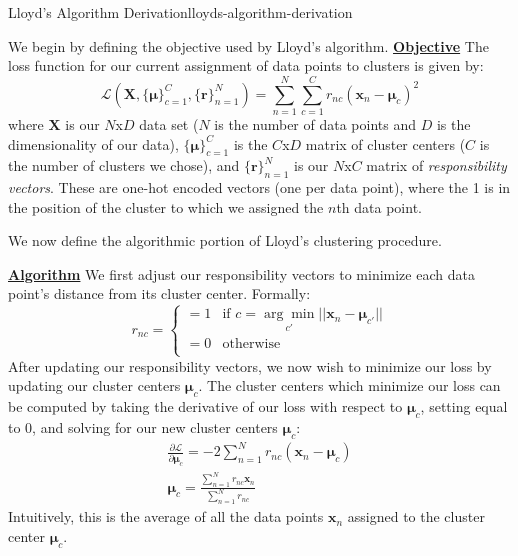 \begin{derivation}{Lloyd's Algorithm Derivation}{lloyds-algorithm-derivation} \newline
	
	We begin by defining the objective used by Lloyd's algorithm. \newline \newline
	\underline{\textbf{Objective}} \newline
	The loss function for our current assignment of data points to clusters is given by:
	\begin{equation} \label{clustering-loss-fn}
		\mathcal{L}(\textbf{X}, \big\{\boldsymbol{\mu}\big\}_{c=1}^{C}, \big\{\textbf{r}\big\}_{n=1}^{N}) = \sum_{n=1}^{N} \sum_{c=1}^{C} r_{nc} (\textbf{x}_{n} - \boldsymbol{\mu}_{c})^{2}
	\end{equation}
	where $\textbf{X}$ is our $N$x$D$ data set ($N$ is the number of data points and $D$ is the dimensionality of our data), $\big\{\boldsymbol{\mu}\big\}_{c=1}^{C}$ is the $C$x$D$ matrix of cluster centers ($C$ is the number of clusters we chose), and $\big\{\textbf{r}\big\}_{n=1}^{N}$ is our $N$x$C$ matrix of \textit{responsibility vectors}. These are one-hot encoded vectors (one per data point), where the 1 is in the position of the cluster to which we assigned the $n$th data point. \newline

	We now define the algorithmic portion of Lloyd's clustering procedure. \newline

	\underline{\textbf{Algorithm}} \newline
	We first adjust our responsibility vectors to minimize each data point's distance from its cluster center. Formally:
	\begin{equation} \label{responsibility-vector-update}
		r_{nc} = \begin{cases}
		 	= 1 & \text{if $c = \underset{c'}{\arg\min} ||\textbf{x}_{n} - \boldsymbol{\mu}_{c'}||$} \\
			= 0 & \text{otherwise} \\
		\end{cases}
	\end{equation}
	After updating our responsibility vectors, we now wish to minimize our loss by updating our cluster centers $\boldsymbol{\mu}_{c}$. The cluster centers which minimize our loss can be computed by taking the derivative of our loss with respect to $\boldsymbol{\mu}_{c}$, setting equal to 0, and solving for our new cluster centers $\boldsymbol{\mu}_{c}$:
	\begin{equation} \label{update-cluster-centers}
		\begin{aligned}
			\frac{\partial \mathcal{L}}{\partial \boldsymbol{\mu}_{c}} = -2 \sum_{n=1}^{N} r_{nc} (\textbf{x}_{n} - \boldsymbol{\mu}_{c}) \\
			\boldsymbol{\mu}_{c} = \frac{\sum_{n=1}^{N} r_{nc} \textbf{x}_{n}}{\sum_{n=1}^{N} r_{nc}}
		\end{aligned}
	\end{equation}
	Intuitively, this is the average of all the data points $\textbf{x}_{n}$ assigned to the cluster center $\boldsymbol{\mu}_{c}$. \newline


\end{derivation}
